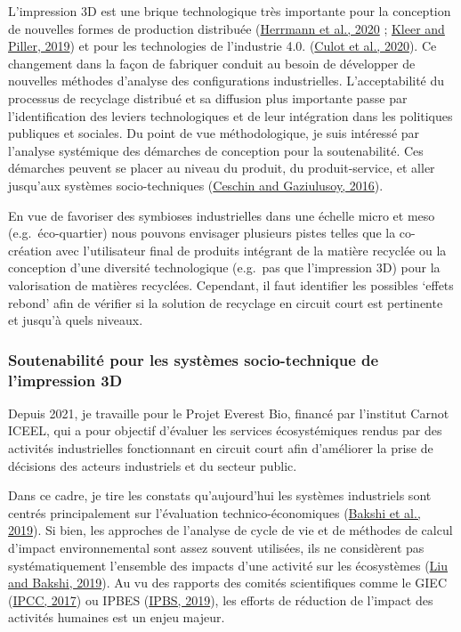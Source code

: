 \documentclass[
  11pt,
]{article}
\begin{document}
L'impression 3D est une brique technologique très importante pour la
conception de nouvelles formes de production distribuée
(\protect\hyperlink{ref-Herrmann2020}{Herrmann et al., 2020} ;
\protect\hyperlink{ref-Kleer2019}{Kleer and Piller, 2019}) et pour les
technologies de l'industrie 4.0.
(\protect\hyperlink{ref-Culot2020}{Culot et al., 2020}). Ce changement
dans la façon de fabriquer conduit au besoin de développer de nouvelles
méthodes d'analyse des configurations industrielles. L'acceptabilité du
processus de recyclage distribué et sa diffusion plus importante passe
par l'identification des leviers technologiques et de leur intégration
dans les politiques publiques et sociales. Du point de vue
méthodologique, je suis intéressé par l'analyse systémique des démarches
de conception pour la soutenabilité. Ces démarches peuvent se placer au
niveau du produit, du produit-service, et aller jusqu'aux systèmes
socio-techniques (\protect\hyperlink{ref-Ceschin2016}{Ceschin and
Gaziulusoy, 2016}).

En vue de favoriser des symbioses industrielles dans une échelle micro
et meso (e.g.~éco-quartier) nous pouvons envisager plusieurs pistes
telles que la co-création avec l'utilisateur final de produits intégrant
de la matière recyclée ou la conception d'une diversité technologique
(e.g.~pas que l'impression 3D) pour la valorisation de matières
recyclées. Cependant, il faut identifier les possibles `effets rebond'
afin de vérifier si la solution de recyclage en circuit court est
pertinente et jusqu'à quels niveaux.

\hypertarget{soutenabilituxe9-pour-les-systuxe8mes-socio-technique-de-limpression-3d}{%
\subsubsection{Soutenabilité pour les systèmes socio-technique de
l'impression
3D}\label{soutenabilituxe9-pour-les-systuxe8mes-socio-technique-de-limpression-3d}}

Depuis 2021, je travaille pour le Projet Everest Bio, financé par
l'institut Carnot ICEEL, qui a pour objectif d'évaluer les services
écosystémiques rendus par des activités industrielles fonctionnant en
circuit court afin d'améliorer la prise de décisions des acteurs
industriels et du secteur public.

Dans ce cadre, je tire les constats qu'aujourd'hui les systèmes
industriels sont centrés principalement sur l'évaluation
technico-économiques (\protect\hyperlink{ref-Bakshi2019b}{Bakshi et al.,
2019}). Si bien, les approches de l'analyse de cycle de vie et de
méthodes de calcul d'impact environnemental sont assez souvent
utilisées, ils ne considèrent pas systématiquement l'ensemble des
impacts d'une activité sur les écosystèmes
(\protect\hyperlink{ref-Liu2019g}{Liu and Bakshi, 2019}). Au vu des
rapports des comités scientifiques comme le GIEC
(\protect\hyperlink{ref-IPCC2017}{IPCC, 2017}) ou IPBES
(\protect\hyperlink{ref-IPBS2019}{IPBS, 2019}), les efforts de réduction
de l'impact des activités humaines est un enjeu majeur.
\end{document}
